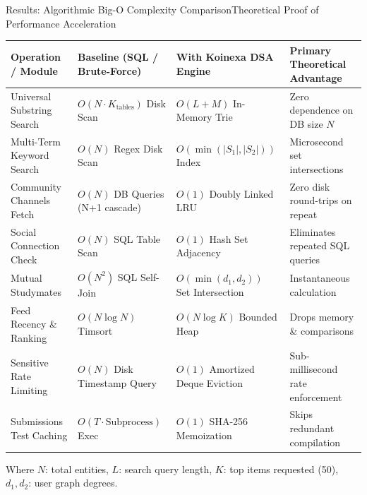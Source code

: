 \documentclass[aspectratio=169,10pt]{beamer}
\begin{document}
\begin{frame}[t]{Results: Algorithmic Big-O Complexity Comparison}{Theoretical Proof of Performance Acceleration}
  \vspace{-0.1cm}
  \begin{center}
  \fontsize{7.0}{8.8}\selectfont
  \renewcommand{\arraystretch}{0.92}
  \setlength{\tabcolsep}{3.5pt}
  \begin{tabular}{llll}
    \toprule
    \textbf{\textcolor{KoinexaRed}{Operation / Module}} & \textbf{\textcolor{KoinexaRed}{Baseline (SQL / Brute-Force)}} & \textbf{\textcolor{KoinexaOrange}{With Koinexa DSA Engine}} & \textbf{\textcolor{KoinexaRed}{Primary Theoretical Advantage}} \\
    \midrule
    Universal Substring Search & $O(N \cdot K_{\text{tables}})$ Disk Scan & $O(L + M)$ In-Memory Trie & Zero dependence on DB size $N$ \\
    Multi-Term Keyword Search & $O(N)$ Regex Disk Scan & $O(\min(|S_1|, |S_2|))$ Index & Microsecond set intersections \\
    Community Channels Fetch & $O(N)$ DB Queries (N+1 cascade) & $O(1)$ Doubly Linked LRU & Zero disk round-trips on repeat \\
    Social Connection Check & $O(N)$ SQL Table Scan & $O(1)$ Hash Set Adjacency & Eliminates repeated SQL queries \\
    Mutual Studymates & $O(N^2)$ SQL Self-Join & $O(\min(d_1, d_2))$ Set Intersection & Instantaneous calculation \\
    Feed Recency \& Ranking & $O(N \log N)$ Timsort & $O(N \log K)$ Bounded Heap & Drops memory \& comparisons \\
    Sensitive Rate Limiting & $O(N)$ Disk Timestamp Query & $O(1)$ Amortized Deque Eviction & Sub-millisecond rate enforcement \\
    Submissions Test Caching & $O(T \cdot \text{Subprocess})$ Exec & $O(1)$ SHA-256 Memoization & Skips redundant compilation \\
    \bottomrule
  \end{tabular}
  \end{center}
  \vspace{0.08cm}
  {\tiny\textcolor{KoinexaGray}{Where $N$: total entities, $L$: search query length, $K$: top items requested (50), $d_1, d_2$: user graph degrees.}}
\end{frame}
\end{document}
